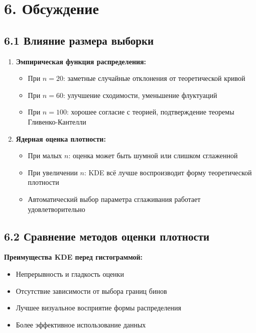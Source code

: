 \documentclass[a4paper,14pt]{extarticle}
\begin{document}
\section*{6. Обсуждение}

\subsection*{6.1 Влияние размера выборки}

\begin{enumerate}
    \item \textbf{Эмпирическая функция распределения:}
    \begin{itemize}
        \item При $n=20$: заметные случайные отклонения от теоретической кривой
        \item При $n=60$: улучшение сходимости, уменьшение флуктуаций
        \item При $n=100$: хорошее согласие с теорией, подтверждение теоремы Гливенко-Кантелли
    \end{itemize}
    
    \item \textbf{Ядерная оценка плотности:}
    \begin{itemize}
        \item При малых $n$: оценка может быть шумной или слишком сглаженной
        \item При увеличении $n$: KDE всё лучше воспроизводит форму теоретической плотности
        \item Автоматический выбор параметра сглаживания работает удовлетворительно
    \end{itemize}
\end{enumerate}

\subsection*{6.2 Сравнение методов оценки плотности}

\textbf{Преимущества KDE перед гистограммой:}
\begin{itemize}
    \item Непрерывность и гладкость оценки
    \item Отсутствие зависимости от выбора границ бинов
    \item Лучшее визуальное восприятие формы распределения
    \item Более эффективное использование данных
\end{itemize}
\end{document}
